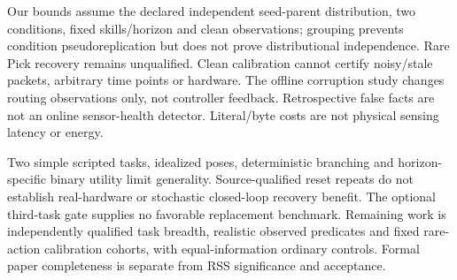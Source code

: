 \documentclass[conference]{IEEEtran}
\begin{document}
Our bounds assume the declared independent seed-parent distribution, two conditions, fixed skills/horizon and clean observations; grouping prevents condition pseudoreplication but does not prove distributional independence. Rare Pick recovery remains unqualified. Clean calibration cannot certify noisy/stale packets, arbitrary time points or hardware. The offline corruption study changes routing observations only, not controller feedback. Retrospective false facts are not an online sensor-health detector. Literal/byte costs are not physical sensing latency or energy.

Two simple scripted tasks, idealized poses, deterministic branching and horizon-specific binary utility limit generality. Source-qualified reset repeats do not establish real-hardware or stochastic closed-loop recovery benefit. The optional third-task gate supplies no favorable replacement benchmark. Remaining work is independently qualified task breadth, realistic observed predicates and fixed rare-action calibration cohorts, with equal-information ordinary controls. Formal paper completeness is separate from RSS significance and acceptance.



\clearpage


\end{document}
